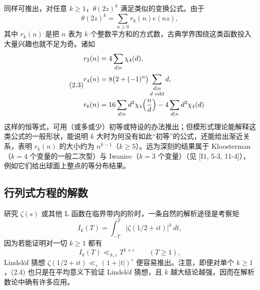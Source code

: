 同样可推出，对任意 $k\ge1$，$\theta(2z)^{k}$ 满足类似的变换公式。由于
\[
\theta(2z)^{k}=\sum_{n\ge0}r_{k}(n)e(nz),
\]
其中 $r_{k}(n)$ 是把 $n$ 表为 $k$ 个整数平方和的方式数，古典学界围绕这类函数投入大量兴趣也就不足为奇。诸如
\begin{equation}\tag{2.3}\label{c3:eq:2.3}
\begin{aligned}
r_{2}(n)&=4\sum_{d\mid n}\chi_{4}(d),\\
r_{4}(n)&=8\bigl(2+(-1)^{n}\bigr)\sum_{\substack{d\mid n\\ d\ \text{odd}}}d,\\
r_{6}(n)&=16\sum_{d\mid n}d^{2}\chi_{4}\Bigl(\frac{n}{d}\Bigr)-4\sum_{d\mid n}d^{2}\chi_{4}(d)
\end{aligned}
\end{equation}
这样的恒等式，可用（或多或少）初等或特设的办法推出；但模形式理论能解释这类公式的一般形状，能说明 $k$ 大时为何没有如此“初等”的公式，还能给出渐近关系，表明 $r_{k}(n)$ 的大小约为 $n^{k-1}$（$k\ge5$）。远为深刻的结果属于 Kloosterman（$k=4$ 个变量的一般二次型）与 Iwaniec（$k=3$ 个变量）（见 [I1, 5-3, 11-4]），例如它们给出球面上整点的等分布结果。

\subsection{行列式方程的解数}\label{c3:sec:2.2}

研究 $\zeta(s)$ 或其他 L 函数在临界带内的阶时，一条自然的解析途径是考察矩
\[
I_{k}(T)=\int_{-T}^{T}\bigl|\zeta(1/2+it)\bigr|^{k}\,dt,
\]
因为若能证明对一切 $k\ge1$ 都有
\begin{equation}\tag{2.4}\label{c3:eq:2.4}
I_{k}(T)\ll_{k,\varepsilon}T^{1+\varepsilon}\qquad(T\ge1),
\end{equation}
Lindelöf 猜想 $\zeta(1/2+it)\ll_{\varepsilon}(1+|t|)^{\varepsilon}$ 便容易推出。注意，即便对单个 $k\ge1$，(2.4) 也只是在平均意义下验证 Lindelöf 猜想，且 $k$ 越大结论越强，因而在解析数论中确有许多应用。


